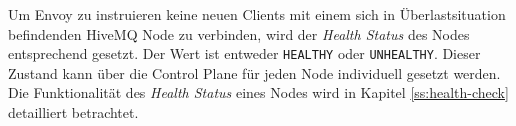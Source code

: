 Um Envoy zu instruieren keine neuen Clients mit einem sich in Überlastsituation befindenden HiveMQ Node zu verbinden, wird der \textit{Health Status} des Nodes entsprechend gesetzt.
Der Wert ist entweder \verb|HEALTHY| oder \verb|UNHEALTHY|. Dieser Zustand kann über die Control Plane für jeden Node individuell gesetzt werden.
\cite{HealthCheckEnvoy}
Die Funktionalität des \textit{Health Status} eines Nodes wird in Kapitel \ref{ss:health-check} detailliert betrachtet.

